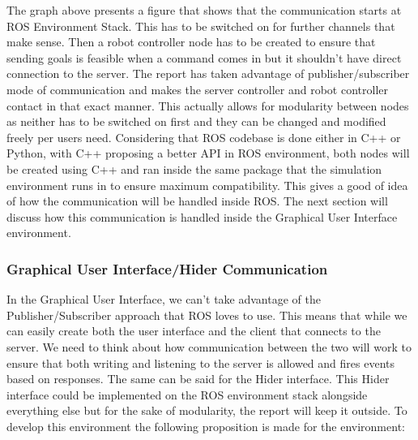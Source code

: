 \documentclass{report}
\begin{document}
        The graph above presents a figure that shows that the communication starts at ROS Environment Stack. This has to be switched on for further channels that make sense. Then a robot controller node has to be created to ensure that sending goals is feasible when a command comes in but it shouldn't have direct connection to the server. The report has taken advantage of publisher/subscriber mode of communication and makes the server controller and robot controller contact in that exact manner. This actually allows for modularity between nodes as neither has to be switched on first and they can be changed and modified freely per users need. Considering that ROS codebase is done either in C++ or Python, with C++ proposing a better API in ROS environment, both nodes will be created using C++ and ran inside the same package that the simulation environment runs in to ensure maximum compatibility. This gives a good of idea of how the communication will be handled inside ROS. The next section will discuss how this communication is handled inside the Graphical User Interface environment.

      \subsubsection{Graphical User Interface/Hider Communication}
        In the Graphical User Interface, we can't take advantage of the Publisher/Subscriber approach that ROS loves to use. This means that while we can easily create both the user interface and the client that connects to the server. We need to think about how communication between the two will work to ensure that both writing and listening to the server is allowed and fires events based on responses. The same can be said for the Hider interface. This Hider interface could be implemented on the ROS environment stack alongside everything else but for the sake of modularity, the report will keep it outside. To develop this environment the following proposition is made for the environment:
\end{document}
